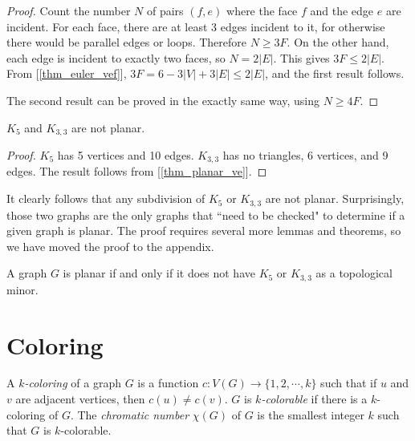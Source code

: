         \begin{proof}
            Count the number $N$ of pairs $(f, e)$ where the face $f$ and the edge $e$ are incident. For each face, there are at least 3 edges incident to it, for otherwise there would be parallel edges or loops. Therefore $N \geq 3F$. On the other hand, each edge is incident to exactly two faces, so $N = 2|E|$. This gives $3F \leq 2|E|$. From [\ref{thm_euler_vef}], $3F = 6-3|V|+3|E| \leq 2|E|$, and the first result follows.
            
            The second result can be proved in the exactly same way, using $N \geq 4F$.
        \end{proof}
        
        \begin{coro} \label{cor_k5_k33}
            $K_5$ and $K_{3,3}$ are not planar.
        \end{coro}
        
        \begin{proof}
            $K_5$ has 5 vertices and 10 edges. $K_{3,3}$ has no triangles, 6 vertices, and 9 edges. The result follows from [\ref{thm_planar_ve}].
        \end{proof}
        
        It clearly follows that any subdivision of $K_5$ or $K_{3,3}$ are not planar. Surprisingly, those two graphs are the only graphs that ``need to be checked" to determine if a given graph is planar. The proof requires several more lemmas and theorems, so we have moved the proof to the appendix.
        
        \begin{thm} \label{thm_kuratowski}
            A graph $G$ is planar if and only if it does not have $K_5$ or $K_{3,3}$ as a topological minor.
        \end{thm}
    
    \section{Coloring}
        \begin{defn}[Coloring] \label{def_coloring}
            A \emph{$k$-coloring} of a graph $G$ is a function $c: V(G) \rightarrow \{1,2,\cdots,k\}$ such that if $u$ and $v$ are adjacent vertices, then $c(u) \neq c(v)$. $G$ is \emph{$k$-colorable} if there is a $k$-coloring of $G$. The \emph{chromatic number} $\chi(G)$ of $G$ is the smallest integer $k$ such that $G$ is $k$-colorable.
        \end{defn}
        
